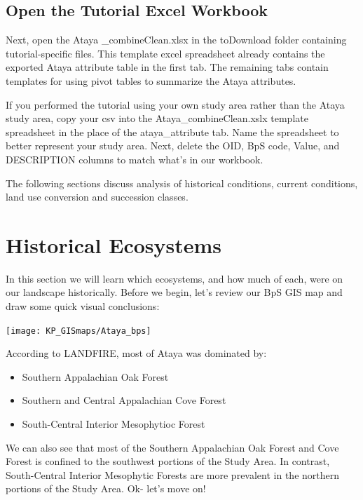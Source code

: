 \documentclass[
]{book}
\providecommand{\tightlist}{%
  \setlength{\itemsep}{0pt}\setlength{\parskip}{0pt}}
\begin{document}
\hypertarget{open-the-tutorial-excel-workbook}{%
\section{Open the Tutorial Excel Workbook}\label{open-the-tutorial-excel-workbook}}

Next, open the Ataya \_combineClean.xlsx in the toDownload folder containing tutorial-specific files. This template excel spreadsheet already contains the exported Ataya attribute table in the first tab. The remaining tabs contain templates for using pivot tables to summarize the Ataya attributes.

If you performed the tutorial using your own study area rather than the Ataya study area, copy your csv into the Ataya\_combineClean.xslx template spreadsheet in the place of the ataya\_attribute tab. Name the spreadsheet to better represent your study area. Next, delete the OID, BpS code, Value, and DESCRIPTION columns to match what's in our workbook.

The following sections discuss analysis of historical conditions, current conditions, land use conversion and succession classes.

\hypertarget{historicalecosystems}{%
\chapter{Historical Ecosystems}\label{historicalecosystems}}

In this section we will learn which ecosystems, and how much of each, were on our landscape historically. Before we begin, let's review our BpS GIS map and draw some quick visual conclusions:

\texttt{[image: KP\_GISmaps/Ataya\_bps]}

According to LANDFIRE, most of Ataya was dominated by:

\begin{itemize}
\tightlist
\item
  Southern Appalachian Oak Forest
\item
  Southern and Central Appalachian Cove Forest
\item
  South-Central Interior Mesophytioc Forest
\end{itemize}

We can also see that most of the Southern Appalachian Oak Forest and Cove Forest is confined to the southwest portions of the Study Area. In contrast, South-Central Interior Mesophytic Forests are more prevalent in the northern portions of the Study Area. Ok- let's move on!
\end{document}
